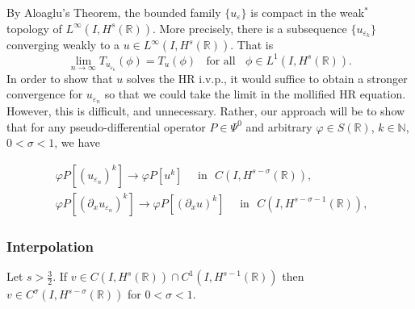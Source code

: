 \documentclass{beamer}
\newcommand{\rr}{\mathbb{R}}
\newcommand{\p}{\partial}
\newcommand{\ee}{\varepsilon}
\newcommand{\vp}{\varphi}
\begin{document}
\begin{frame}
	By Aloaglu's Theorem, the bounded family $\{u_\ee\}$ is compact in the weak$^*$ topology of $L^\infty(I, H^s(\rr))$. More precisely,
there is a subsequence  $\{ u_{\ee_k} \}$ converging
weakly to a $ u\in L^{\infty}(I, H^s(\rr))$.
That is 
%
%
%
\begin{equation*}
\label{weak-conv}
\lim_{n\to \infty} T_{u_{\ee_k}}(\phi)  =  T_u (\phi) \; \;		\text{ for 
all } \;\;  \phi \in L^1(I, H^{s}(\rr)).
\end{equation*}
%
In order to show that $u$ solves the HR i.v.p., it would
		suffice to obtain a stronger convergence for  $u_{\ee_n}$ so that 
		we could take the limit in the mollified HR equation. However,
		this is difficult, and unnecessary. Rather, our approach will be to
		show that for any pseudo-differential operator
		$P \in \Psi^0$ and arbitrary $\vp \in S(\rr)$, $k \in
		\mathbb{N}$, $0< \sigma < 1$, we have
\end{frame}
%
\begin{frame}
			\begin{align}
			\label{hhstrong-conv}
			& \varphi P [(u_{\ee_n})^k] \longrightarrow \varphi P [u^k]  
			\quad
			\text{ in } \,\,   C(I, H^{s-\sigma}(\rr)), \ \,
			\\
			\label{hhstrong-conv-next}
			& \varphi P [(\p_x u_{\ee_n})^k] \longrightarrow \varphi P
			[(\p_x u)^k]  
			\quad
			\text{ in } \,\,   C(I, H^{s-\sigma -1}(\rr)), \ \ 
		\end{align}
		\end{frame}
%
%
%
%
\begin{frame}
  \frametitle{Interpolation}
\begin{lemma}
\label{interpolation-lem}
Let  $s > \frac{3}{2}$.
If $v \in C(I, H^s(\rr)) \cap C^1(I, H^{s-1}(\rr))$
then $v \in C^\sigma (I, H^{s- \sigma}(\rr))$ for  $0 < \sigma < 1$.
\end{lemma}
%
%
\end{frame}
%
\end{document}
